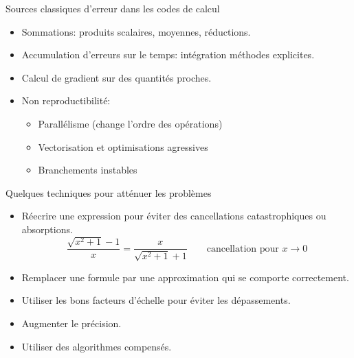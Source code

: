 \documentclass{beamer}
\begin{document}
\begin{frame}{Sources classiques d'erreur dans les codes de calcul}
    \begin{itemize}
        \item Sommations: produits scalaires, moyennes, réductions.
        \item Accumulation d'erreurs sur le temps: intégration méthodes explicites.
        \item Calcul de gradient sur des quantités proches.
        \item Non reproductibilité:
              \begin{itemize}
                  \item Parallélisme (change l'ordre des opérations)
                  \item Vectorisation et optimisations agressives
                  \item Branchements instables
              \end{itemize}
    \end{itemize}
\end{frame}
\begin{frame}{Quelques techniques pour atténuer les problèmes}
    \begin{itemize}
        \item Réecrire une expression pour éviter des cancellations catastrophiques ou absorptions.
              \[ \frac{\sqrt{x^2+1}-1}{x} = \frac{x}{\sqrt{x^2+1}+1} \qquad \text {cancellation pour } x \rightarrow 0 \]
        \item Remplacer une formule par une approximation qui se comporte correctement.
        \item Utiliser les bons facteurs d'échelle pour éviter les dépassements.
        \item Augmenter le précision.
        \item Utiliser des algorithmes compensés.
    \end{itemize}
\end{frame}
\end{document}
